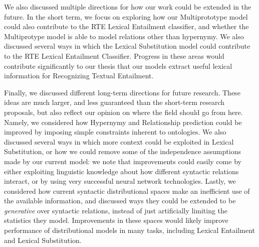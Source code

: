 \documentclass[letterpaper]{article}
\begin{document}
We also discussed multiple directions for how our work could be extended
in the future. In the short term, we focus on exploring how our Multiprototype
model could also contribute to the RTE Lexical Entailment classifier, and
whether the Multiprotype model is able to model relations other than hypernymy.
We also discussed several ways in which the Lexical Substitution model could
contribute to the RTE Lexical Entailment Classifier. Progress in these areas
would contribute significantly to our thesis that our models extract useful
lexical information for Recognizing Textual Entailment.

Finally, we discussed different long-term directions for future research. These
ideas are much larger, and less guaranteed than the short-term research
proposals, but also reflect our opinion on where the field should go from here.
Namely, we considered how Hypernymy and Relationship prediction could be
improved by imposing simple constraints inherent to ontologies. We also
discussed several ways in which more context could be exploited in Lexical
Substitution, or how we could remove some of the independence assumptions made
by our current model: we note that improvements could easily come by either
exploiting linguistic knowledge about how different syntactic relations
interact, or by using very successful neural network technologies. Lastly, we
considered how current syntactic distributional spaces make an inefficient use
of the available information, and discussed ways they could be extended to be
{\em generative} over syntactic relations, instead of just artificially
limiting the statistics they model. Improvements in these spaces would likely
improve performance of distributional models in many tasks, including
Lexical Entailment and Lexical Substitution.

\pagebreak


\end{document}

